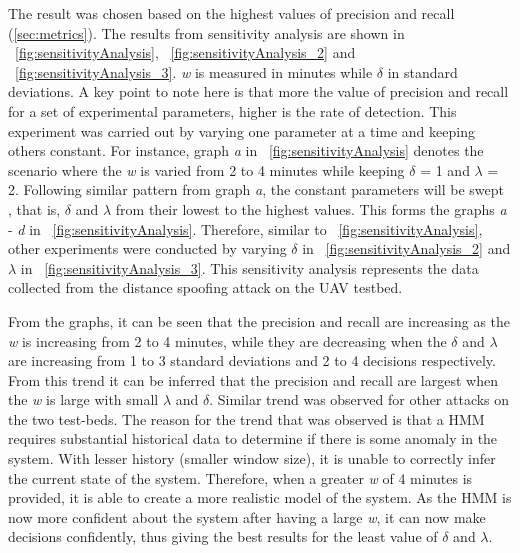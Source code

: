 The result was chosen based on the highest values of precision and recall (\autoref{sec:metrics}). The results from sensitivity analysis are shown in ~\autoref{fig:sensitivityAnalysis}, ~\autoref{fig:sensitivityAnalysis_2} and ~\autoref{fig:sensitivityAnalysis_3}. \textit{w} is measured in minutes while $\delta$ in standard deviations. A key point to note here is that more the value of precision and recall for a set of experimental parameters, higher is the rate of detection. This experiment was carried out by varying one parameter at a time and keeping others constant. For instance, graph \textit{a} in ~\autoref{fig:sensitivityAnalysis} denotes the scenario where the \textit{w} is varied from 2 to 4 minutes while keeping $\delta$ = 1 and $\lambda$ = 2. Following similar pattern from  graph \textit{a}, the constant parameters will be swept , that is, $\delta$ and $\lambda$ from their lowest to the highest values. This forms the graphs \textit{a} - \textit{d} in ~\autoref{fig:sensitivityAnalysis}. Therefore, similar to ~\autoref{fig:sensitivityAnalysis}, other experiments were conducted by varying $\delta$ in ~\autoref{fig:sensitivityAnalysis_2} and $\lambda$ in ~\autoref{fig:sensitivityAnalysis_3}. This sensitivity analysis represents the data collected from the distance spoofing attack on the \ac{UAV} testbed. 

From the graphs, it can be seen that the precision and recall are increasing as the \textit{w} is increasing from 2 to 4 minutes, while they are decreasing when the $\delta$ and $\lambda$ are increasing from 1 to 3 standard deviations and 2 to 4 decisions respectively. From this trend it can be inferred that the precision and recall are largest when the \textit{w} is large with small $\lambda$ and $\delta$. Similar trend was observed for other attacks on the two test-beds. The reason for the trend that was observed is that a \ac{HMM} requires substantial historical data to determine if there is some anomaly in the system. With lesser history (smaller window size), it is unable to correctly infer the current state of the system. Therefore, when a greater \textit{w} of 4 minutes is provided, it is able to create a more realistic model of the system. As the \ac{HMM} is now more confident about the system after having a large \textit{w}, it can now make decisions confidently, thus giving the best results for the least value of $\delta$ and $\lambda$.


